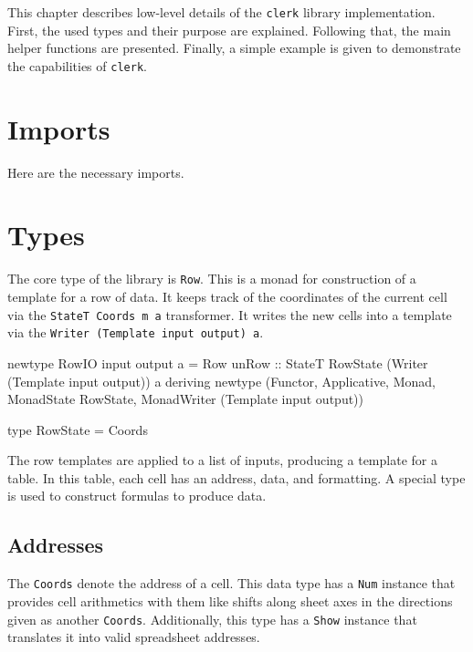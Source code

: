 
This chapter describes low-level details of the \texttt{clerk} library implementation. First, the used types and their purpose are explained. Following that, the main helper functions are presented. Finally, a simple example is given to demonstrate the capabilities of \texttt{clerk}.

\section{Imports}

Here are the necessary imports.



\section{Types}
\label{sec:types}

The core type of the library is \texttt{Row}. This is a monad for construction of a template for a row of data. It keeps track of the coordinates of the current cell via the \texttt{StateT Coords m a} transformer. It writes the new cells into a template via the \texttt{Writer (Template input output) a}.

\begin{mycode}
  newtype RowIO input output a = Row
    {unRow :: StateT RowState (Writer (Template input output)) a}
  deriving newtype (Functor, Applicative, Monad, MonadState RowState, MonadWriter (Template input output))

  type RowState = Coords
\end{mycode}

The row templates are applied to a list of inputs, producing a template for a table.
In this table, each cell has an address, data, and formatting. A special type is used to construct formulas to produce data.

\subsection{Addresses}
\label{sec:addresses}

The \texttt{Coords} denote the address of a cell. This data type has a \texttt{Num} instance that provides cell arithmetics with them like shifts along sheet axes in the directions given as another \texttt{Coords}. Additionally, this type has a \texttt{Show} instance that translates it into valid spreadsheet addresses.

